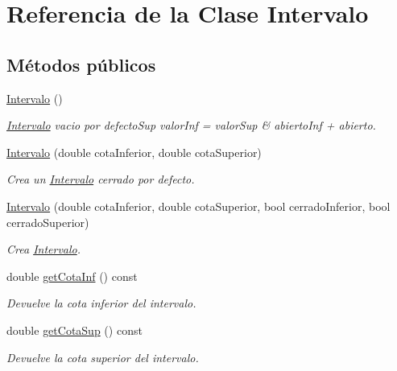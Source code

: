 \hypertarget{classIntervalo}{}\section{Referencia de la Clase Intervalo}
\label{classIntervalo}
\subsection*{Métodos públicos}
\begin{DoxyCompactItemize}
\item 
\mbox{\label{classIntervalo_a9b5b23dda7ee26b444898457959cb03d}} 
\mbox{\hyperlink{classIntervalo_a9b5b23dda7ee26b444898457959cb03d}{Intervalo}} ()
\begin{DoxyCompactList}\small\item\em \mbox{\hyperlink{classIntervalo}{Intervalo}} vacio por defecto\+Sup valor\+Inf = valor\+Sup \& abierto\+Inf + abierto. \end{DoxyCompactList}\item 
\mbox{\hyperlink{classIntervalo_a321e56ef7e1f4a774bd64cc2609156f4}{Intervalo}} (double cota\+Inferior, double cota\+Superior)
\begin{DoxyCompactList}\small\item\em Crea un \mbox{\hyperlink{classIntervalo}{Intervalo}} cerrado por defecto. \end{DoxyCompactList}\item 
\mbox{\hyperlink{classIntervalo_af70d523399465f51862977a303656c72}{Intervalo}} (double cota\+Inferior, double cota\+Superior, bool cerrado\+Inferior, bool cerrado\+Superior)
\begin{DoxyCompactList}\small\item\em Crea \mbox{\hyperlink{classIntervalo}{Intervalo}}. \end{DoxyCompactList}\item 
double \mbox{\hyperlink{classIntervalo_aafa3f6ec78c6bd44b568e343fb22fc90}{get\+Cota\+Inf}} () const
\begin{DoxyCompactList}\small\item\em Devuelve la cota inferior del intervalo. \end{DoxyCompactList}\item 
double \mbox{\hyperlink{classIntervalo_a2dd767a860e4e85ec3d5a44e78884b76}{get\+Cota\+Sup}} () const
\begin{DoxyCompactList}\small\item\em Devuelve la cota superior del intervalo. \end{DoxyCompactList}\item 

\end{DoxyCompactItemize}
